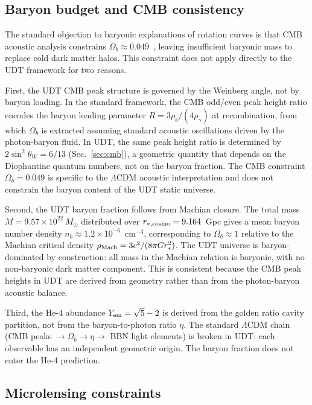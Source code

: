 \documentclass[aps,prd,twocolumn,superscriptaddress,nofootinbib,longbibliography]{revtex4-2}
\begin{document}
\subsection{Baryon budget and CMB consistency}

The standard objection to baryonic explanations of rotation curves is
that CMB acoustic analysis constrains
$\Omega_b \approx 0.049$~\cite{PlanckParams2020}, leaving
insufficient baryonic mass to replace cold dark matter halos.  This
constraint does not apply directly to the UDT framework for two
reasons.

First, the UDT CMB peak structure is governed by the Weinberg angle,
not by baryon loading.  In the standard framework, the CMB odd/even
peak height ratio encodes the baryon loading parameter
$R = 3\rho_b/(4\rho_\gamma)$ at recombination, from which $\Omega_b$
is extracted assuming standard acoustic oscillations driven by the
photon-baryon fluid.  In UDT, the same peak height ratio is determined
by $2\sin^2\theta_W = 6/13$ (Sec.~\ref{sec:cmb}), a geometric
quantity that depends on the Diophantine quantum numbers, not on the
baryon fraction.  The CMB constraint $\Omega_b = 0.049$ is specific to
the $\Lambda$CDM acoustic interpretation and does not constrain the
baryon content of the UDT static universe.

Second, the UDT baryon fraction follows from Machian closure.  The
total mass $M = 9.57 \times 10^{22}\,M_\odot$ distributed over
$r_{*,\rm cosmo} = 9.164$~Gpc gives a mean baryon number density
$n_b \approx 1.2 \times 10^{-6}$~cm$^{-3}$, corresponding to
$\Omega_b \approx 1$ relative to the Machian critical density
$\rho_{\rm Mach} = 3c^2/(8\pi G r_*^2)$.  The UDT universe is
baryon-dominated by construction: all mass in the Machian relation is
baryonic, with no non-baryonic dark matter component.  This is
consistent because the CMB peak heights in UDT are derived from
geometry rather than from the photon-baryon acoustic balance.

Third, the He-4 abundance $Y_{\rm em} = \sqrt{5}-2$ is derived from
the golden ratio cavity partition, not from the baryon-to-photon ratio
$\eta$.  The standard $\Lambda$CDM chain (CMB peaks $\to \Omega_b \to
\eta \to$ BBN light elements) is broken in UDT: each observable has an
independent geometric origin.  The baryon fraction does not enter the
He-4 prediction.

\subsection{Microlensing constraints}
\end{document}
